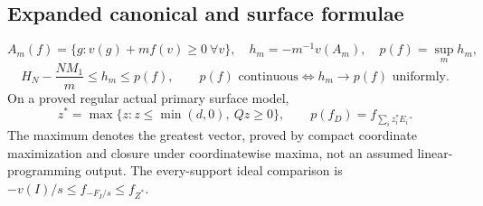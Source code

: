 \subsection*{Expanded canonical and surface formulae}
\[
A_m(f)=\{g:v(g)+mf(v)\geq0\ \forall v\},\quad
h_m=-m^{-1}v(A_m),\quad p(f)=\sup_m h_m,
\]
\[
H_N-\frac{NM_1}{m}\leq h_m\leq p(f),\qquad
p(f)\text{ continuous}\Longleftrightarrow h_m\to p(f)\text{ uniformly}.
\]
On a proved regular actual primary surface model,
\[
z^*=\max\{z:z\leq\min(d,0),\ Qz\geq0\},\qquad
p(f_D)=f_{\sum_i z_i^*E_i}.
\]
The maximum denotes the greatest vector, proved by compact coordinate
maximization and closure under coordinatewise maxima, not an assumed
linear-programming output. The every-support ideal comparison is
$-v(I)/s\leq f_{-F_I/s}\leq f_{Z^*}$.

